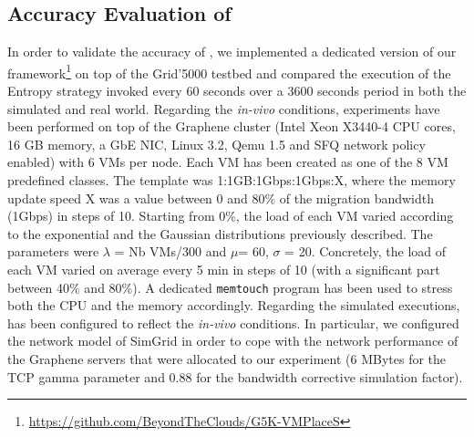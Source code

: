 \subsection{Accuracy Evaluation of \vmps}
\label{subsec:accuracy}
In order to validate the accuracy of \vmps, we implemented a dedicated
version of our
framework\footnote{\url{https://github.com/BeyondTheClouds/G5K-VMPlaceS}}
on top of the Grid'5000 testbed and compared the execution of the
Entropy strategy invoked every 60 seconds over a 3600 seconds period
in both the simulated and real world. Regarding the \textit{in-vivo}
conditions, experiments have been performed on top of the Graphene
cluster (Intel Xeon X3440-4 CPU cores, 16 GB memory, a GbE NIC, Linux
3.2, Qemu 1.5 and SFQ network policy enabled) with 6 VMs per node.
Each VM has been created as one of the 8 VM predefined classes. The
template was 1:1GB:1Gbps:1Gbps:X, where the memory update speed X was
a value between 0 and 80\% of the migration bandwidth (1Gbps) in steps
of 10. Starting from 0\%, the load of each VM varied according to the
exponential and the Gaussian distributions previously described. The
parameters were $\lambda$ = Nb VMs/300 and $\mu$= 60, $\sigma$ = 20.
Concretely, the load of each VM varied on average every 5 min in steps
of 10 (with a significant part between 40\% and 80\%). A dedicated
\texttt{memtouch} program\cite{Hirofuchi:2013:ALM:2568486.2568524} has
been used to stress both the CPU and the memory accordingly. Regarding
the simulated executions, \vmps has been configured to reflect the
\textit{in-vivo} conditions. In particular, we configured the network model of
SimGrid in order to cope with the network performance of the Graphene
servers that were allocated to our experiment (6 MBytes for the TCP
gamma parameter and 0.88 for the bandwidth corrective simulation
factor).

